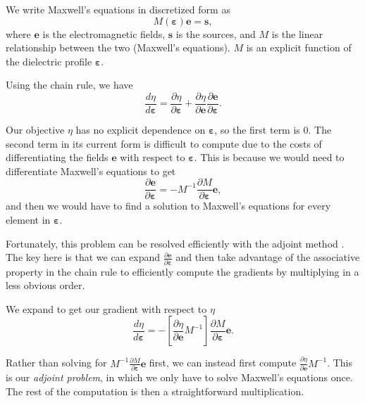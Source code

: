 \documentclass[%
 reprint,
 amsmath,amssymb,
 aps
]{revtex4-2}
\begin{document}
We write Maxwell's equations in discretized form as \begin{equation}
    M(\pmb{\varepsilon}) \pmb{e} = \pmb{s},
\end{equation}
where $\pmb{e}$ is the electromagnetic fields, $\pmb{s}$ is the sources, and $M$ is the linear relationship between the two (Maxwell's equations). $M$ is an explicit function of the dielectric profile $\pmb{\varepsilon}$.

Using the chain rule, we have \begin{equation}
    \frac{d\eta}{d\pmb{\varepsilon}} = \frac{\partial\eta}{\partial \pmb{\varepsilon}} + \frac{\partial \eta}{\partial \pmb{e}} \frac{\partial \pmb{e}}{\partial\pmb{\varepsilon}}.
\end{equation}

Our objective $\eta$ has no explicit dependence on $\pmb{\varepsilon}$, so the first term is $0$. The second term in its current form is difficult to compute due to the costs of differentiating the fields $\pmb{e}$ with respect to $\pmb{\varepsilon}.$ This is because we would need to differentiate Maxwell's equations to get \begin{equation}\label{differentiate} \frac{\partial\pmb{e}}{\partial \pmb{\varepsilon}} =-M^{-1}\frac{\partial M}{\partial \pmb{\varepsilon}} \pmb{e},\end{equation}
and then we would have to find a solution to Maxwell's equations for every element in $\pmb{\varepsilon}$.

Fortunately, this problem can be resolved efficiently with the adjoint method \cite{adjoint}. The key here is that we can expand $\frac{\partial \pmb{e}}{\partial\pmb{\varepsilon}}$ and then take advantage of the associative property in the chain rule to efficiently compute the gradients by multiplying in a less obvious order. 

We expand to get our gradient with respect to $\eta$ \begin{equation} \label{full_adjoint}
   \frac{d\eta}{d\pmb{\varepsilon}} = -\left [\frac{\partial \eta}{\partial \pmb{e}} M^{-1}\right ]\frac{\partial M}{\partial \pmb{\varepsilon}} \pmb{e}.
\end{equation}

Rather than solving for $M^{-1}\frac{\partial M}{\partial \pmb{\varepsilon}} \pmb{e}$ first, we can instead first compute $\frac{\partial \eta}{\partial \pmb{e}} M^{-1}$. This is our {\it adjoint problem}, in which we only have to solve Maxwell's equations once. The rest of the computation is then a straightforward multiplication.
\end{document}
